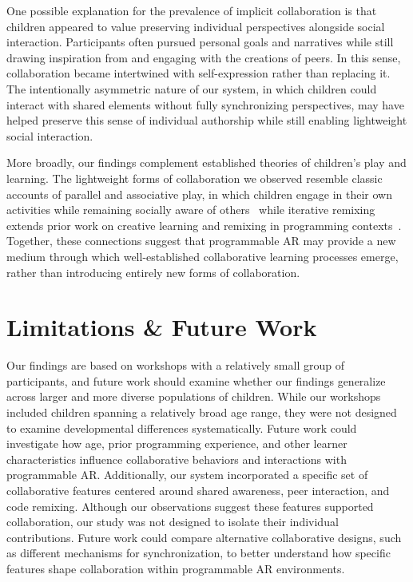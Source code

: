 \documentclass[sigconf,nonacm]{acmart}
\begin{document}
One possible explanation for the prevalence of implicit collaboration is that children appeared to value preserving individual perspectives alongside social interaction. Participants often pursued personal goals and narratives while still drawing inspiration from and engaging with the creations of peers. In this sense, collaboration became intertwined with self-expression rather than replacing it. The intentionally asymmetric nature of our system, in which children could interact with shared elements without fully synchronizing perspectives, may have helped preserve this sense of individual authorship while still enabling lightweight social interaction.

More broadly, our findings complement established theories of children's play and learning. The lightweight forms of collaboration we observed resemble classic accounts of parallel and associative play, in which children engage in their own activities while remaining socially aware of others~\cite{Parten32} while iterative remixing extends prior work on creative learning and remixing in programming contexts~\cite{Resnick17}. Together, these connections suggest that programmable AR may provide a new medium through which well-established collaborative learning processes emerge, rather than introducing entirely new forms of collaboration.

\section{Limitations \& Future Work}
Our findings are based on workshops with a relatively small group of participants, and future work should examine whether our findings generalize across larger and more diverse populations of children. While our workshops included children spanning a relatively broad age range, they were not designed to examine developmental differences systematically. Future work could investigate how age, prior programming experience, and other learner characteristics influence collaborative behaviors and interactions with programmable AR. Additionally, our system incorporated a specific set of collaborative features centered around shared awareness, peer interaction, and code remixing. Although our observations suggest these features supported collaboration, our study was not designed to isolate their individual contributions. Future work could compare alternative collaborative designs, such as different mechanisms for synchronization, to better understand how specific features shape collaboration within programmable AR environments.
\end{document}
